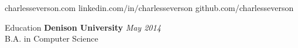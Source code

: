 \documentclass{resume} %
\begin{document}
\centerline{charlesseverson.com {\large\textperiodcentered} linkedin.com$/$in$/$charlesseverson {\large\textperiodcentered} github.com/charlesseverson}
\begin{rSection}{Education}
{\bf Denison University} \hfill {\em May 2014} \\ 
B.A. in Computer Science 
\end{rSection}

\end{document}
